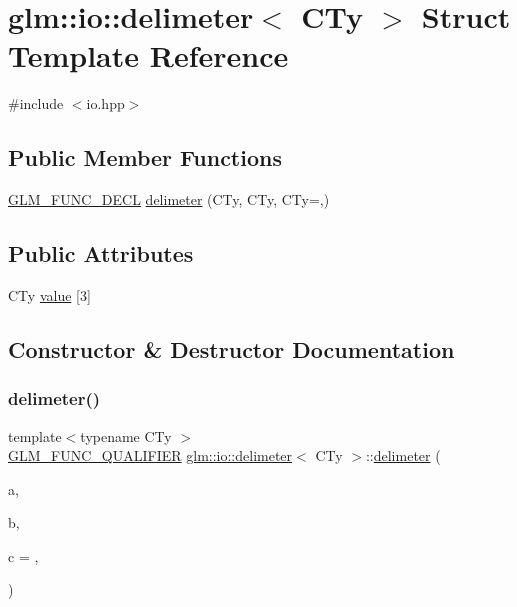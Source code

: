 \hypertarget{structglm_1_1io_1_1delimeter}{}\section{glm\+:\+:io\+:\+:delimeter$<$ C\+Ty $>$ Struct Template Reference}
\label{structglm_1_1io_1_1delimeter}


{\ttfamily \#include $<$io.\+hpp$>$}

\subsection*{Public Member Functions}
\begin{DoxyCompactItemize}
\item 
\hyperlink{setup_8hpp_ab2d052de21a70539923e9bcbf6e83a51}{G\+L\+M\+\_\+\+F\+U\+N\+C\+\_\+\+D\+E\+CL} \hyperlink{structglm_1_1io_1_1delimeter_a5c1db62fae08a4c96eaf336781a4b53d}{delimeter} (C\+Ty, C\+Ty, C\+Ty=\textquotesingle{},\textquotesingle{})
\end{DoxyCompactItemize}
\subsection*{Public Attributes}
\begin{DoxyCompactItemize}
\item 
C\+Ty \hyperlink{structglm_1_1io_1_1delimeter_a9ade129dae50c4f716f724e7425f9c68}{value} \mbox{[}3\mbox{]}
\end{DoxyCompactItemize}


\subsection{Constructor \& Destructor Documentation}
\mbox{\label{structglm_1_1io_1_1delimeter_a5c1db62fae08a4c96eaf336781a4b53d}} 
\subsubsection{\texorpdfstring{delimeter()}{delimeter()}}
{\footnotesize\ttfamily template$<$typename C\+Ty $>$ \\
\hyperlink{setup_8hpp_a33fdea6f91c5f834105f7415e2a64407}{G\+L\+M\+\_\+\+F\+U\+N\+C\+\_\+\+Q\+U\+A\+L\+I\+F\+I\+ER} \hyperlink{structglm_1_1io_1_1delimeter}{glm\+::io\+::delimeter}$<$ C\+Ty $>$\+::\hyperlink{structglm_1_1io_1_1delimeter}{delimeter} (\begin{DoxyParamCaption}\item[{C\+Ty}]{a,  }\item[{C\+Ty}]{b,  }\item[{C\+Ty}]{c = {\ttfamily \textquotesingle{},\textquotesingle{}} }\end{DoxyParamCaption})\hspace{0.3cm}{\ttfamily [explicit]}}



